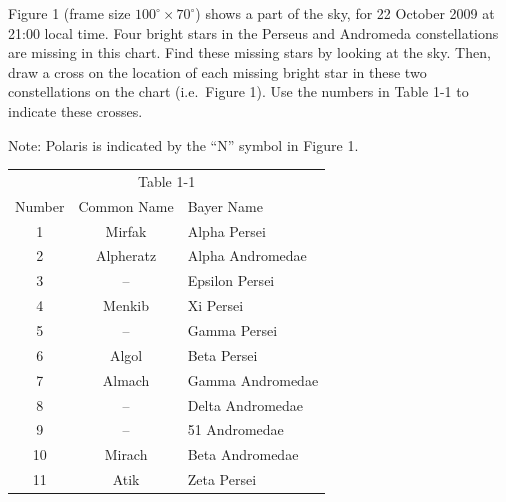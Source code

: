 Figure 1 (frame size $100^\circ \times 70^\circ$) shows a part of the sky,
for 22 October 2009 at 21:00 local time. Four bright stars in the Perseus
and Andromeda constellations are missing in this chart. Find these missing
stars by looking at the sky. Then, draw a cross on the location of each
missing bright star in these two constellations on the chart (i.e.\
Figure 1). Use the numbers in Table 1-1 to indicate these crosses.

Note: Polaris is indicated by the ``N'' symbol in Figure 1.

\begin{center}
\begin{tabular}{ccl}
\multicolumn{3}{c}{Table 1-1}\\
Number & Common Name & Bayer Name \\
\hline
1 & Mirfak & Alpha Persei \\
2 & Alpheratz & Alpha Andromedae \\
3 & -- & Epsilon Persei \\
4 & Menkib & Xi Persei \\
5 & -- & Gamma Persei \\
6 & Algol & Beta Persei \\
7 & Almach & Gamma Andromedae \\
8 & -- & Delta Andromedae \\
9 & -- & 51 Andromedae \\
10 & Mirach & Beta Andromedae \\
11 & Atik & Zeta Persei \\
\end{tabular}
\end{center}

